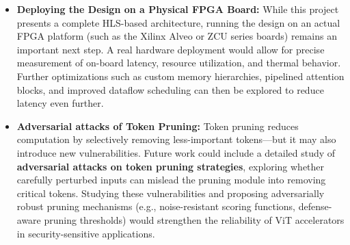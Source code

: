 \begin{itemize}

   

    \item \textbf{Deploying the Design on a Physical FPGA Board:}  
While this project presents a complete HLS-based architecture, running the design on an actual FPGA platform (such as the Xilinx Alveo or ZCU series boards) remains an important next step. A real hardware deployment would allow for precise measurement of on-board latency, resource utilization, and thermal behavior. Further optimizations such as custom memory hierarchies, pipelined attention blocks, and improved dataflow scheduling can then be explored to reduce latency even further.

\item \textbf{Adversarial attacks of Token Pruning:}  
Token pruning reduces computation by selectively removing less-important tokens—but it may also introduce new vulnerabilities. Future work could include a detailed study of \textbf{adversarial attacks on token pruning strategies}, exploring whether carefully perturbed inputs can mislead the pruning module into removing critical tokens. Studying these vulnerabilities and proposing adversarially robust pruning mechanisms (e.g., noise-resistant scoring functions, defense-aware pruning thresholds) would strengthen the reliability of ViT accelerators in security-sensitive applications.


\end{itemize}
